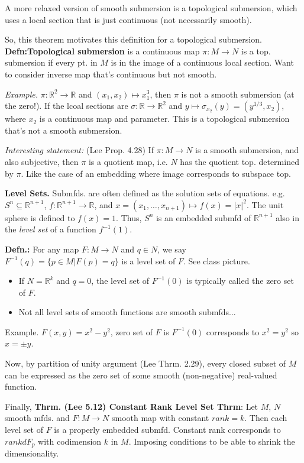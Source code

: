 \documentclass[12pt,letterpaper]{article}
\begin{document}
A more relaxed version of smooth submersion is a topological submersion, which uses a local section that is just continuous (not necessarily smooth). 

So, this theorem motivates this definition for a topological submersion. \textbf{Defn:Topological submersion}  is a continuous map $\pi: M \rightarrow N$ is a top. submersion if every pt. in $M$ is in the image of a continuous local section. Want to consider inverse map that's continuous but not smooth. 

\textit{Example.} $\pi: \mathbb{R}^2 \rightarrow \mathbb{R}$ and $(x_1, x_2) \mapsto x_1^3$, then $\pi$ is not a smooth submersion (at the zero!). If the lcoal sections are $\sigma: \mathbb{R} \rightarrow \mathbb{R}^2$ and $y \mapsto \sigma_{x_2}(y) = (y^{1/3}, x_2)$, where $x_2$ is a continuous map and parameter. This is a topological submersion that's not a smooth submersion. 

\textit{Interesting statement:} (Lee Prop. 4.28) If $\pi : M \rightarrow N$ is a smooth submersion, and also subjective, then $\pi$ is a quotient map, i.e. $N$ has the quotient top. determined by $\pi$. Like the case of an embedding where image corresponds to subspace top. 

\textbf{Level Sets.} Submfds. are often defined as the solution sets of equations. e.g. $S^n \subseteq \mathbb{R}^{n+1}$, $f: \mathbb{R}^{n+1} \rightarrow \mathbb{R}$, and $x=(x_1, \dots, x_{n+1}) \mapsto f(x) = |x|^2$. The unit sphere is defined to $f(x)=1.$ Thus, $S^n$ is an embedded submfd of $\mathbb{R}^{n+1}$ also in the \textit{level set} of a function $f^{-1}(1)$. 

\textbf{Defn.:} For any map $F: M \rightarrow N$ and $q \in N$, we say $F^{-1}(q) = \{ p \in M | F(p) = q\}$ is a level set of $F$. See class picture. 
\begin{itemize}
    \item If $N = \mathbb{R}^k$ and $q = 0$, the level set of $F^{-1}(0)$ is typically called the zero set of $F$.
    \item Not all level sets of smooth functions are smooth submfds...
\end{itemize}

Example. $F(x,y) = x^2 - y^2$, zero set of $F$ is $F^{-1}(0)$ corresponds to $x^2 = y^2$ so $x=\pm y$.

Now, by partition of unity argument (Lee Thrm. 2.29), every closed subset of $M$ can be expressed as the zero set of some smooth (non-negative) real-valued function. 

Finally, \textbf{Thrm. (Lee 5.12) Constant Rank Level Set Thrm}: Let $M$, $N$ smooth mfds. and $F: M \rightarrow N$ smooth map with constant $rank=k$. Then each level set of $F$ is a properly embedded submfd. Constant rank corresponds to $rank dF_p$ with codimension $k$ in $M$. Imposing conditions to be able to shrink the dimensionality.
\end{document}
